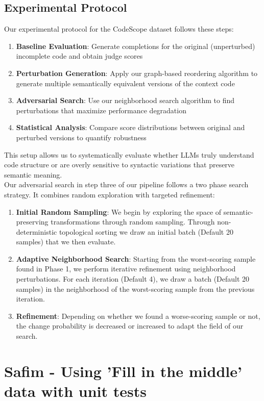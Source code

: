 \documentclass[%
thesis=student,%
coverpage=false,%
titlepage=false,%
headmarks=true, %
english,%
font=libertine, %
math=newpxtx, %
BCOR=5mm,%
coverBCOR=11mm%
]{tum-templates/book/tumbook}
\begin{document}
\subsection{Experimental Protocol}
Our experimental protocol for the CodeScope dataset follows these steps:
\begin{enumerate}
\item \textbf{Baseline Evaluation}: Generate completions for the original (unperturbed) incomplete code and obtain judge scores
\item \textbf{Perturbation Generation}: Apply our graph-based reordering algorithm to generate multiple semantically equivalent versions of the context code
\item \textbf{Adversarial Search}: Use our neighborhood search algorithm to find perturbations that maximize performance degradation
\item \textbf{Statistical Analysis}: Compare score distributions between original and perturbed versions to quantify robustness
\end{enumerate}
This setup allows us to systematically evaluate whether LLMs truly understand code structure or are overly sensitive to syntactic variations that preserve semantic meaning.\\
Our adversarial search in step three of our pipeline follows a two phase search strategy. It combines random exploration with targeted refinement:
\begin{enumerate}
    \item \textbf{Initial Random Sampling}: We begin by exploring the space of semantic-preserving transformations through random sampling. Through non-deterministic topological sorting we draw an initial batch (Default 20 samples) that we then evaluate.
    \item \textbf{Adaptive Neighborhood Search}: Starting from the worst-scoring sample found in Phase 1, we perform iterative refinement using neighborhood perturbations. For each iteration (Default 4), we draw a batch (Default 20 samples) in the neighborhood of the worst-scoring sample from the previous iteration.
    \item \textbf{Refinement}: Depending on whether we found a worse-scoring sample or not, the change probability is decreased or increased to adapt the field of our search.
\end{enumerate}



\section{Safim - Using 'Fill in the middle' data with unit tests}
\end{document}

